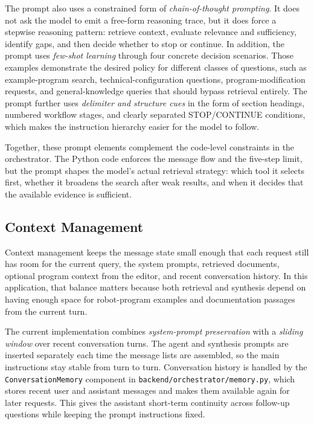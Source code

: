 The prompt also uses a constrained form of \textit{chain-of-thought prompting}. It does not ask the model to emit a free-form reasoning trace, but it does force a stepwise reasoning pattern: retrieve context, evaluate relevance and sufficiency, identify gaps, and then decide whether to stop or continue. In addition, the prompt uses \textit{few-shot learning} through four concrete decision scenarios. Those examples demonstrate the desired policy for different classes of questions, such as example-program search, technical-configuration questions, program-modification requests, and general-knowledge queries that should bypass retrieval entirely. The prompt further uses \textit{delimiter and structure cues} in the form of section headings, numbered workflow stages, and clearly separated STOP/CONTINUE conditions, which makes the instruction hierarchy easier for the model to follow.

Together, these prompt elements complement the code-level constraints in the orchestrator. The Python code enforces the message flow and the five-step limit, but the prompt shapes the model's actual retrieval strategy: which tool it selects first, whether it broadens the search after weak results, and when it decides that the available evidence is sufficient.


\subsection{Context Management}
Context management keeps the message state small enough that each request still has room for the current query, the system prompts, retrieved documents, optional program context from the editor, and recent conversation history. In this application, that balance matters because both retrieval and synthesis depend on having enough space for robot-program examples and documentation passages from the current turn.

The current implementation combines \textit{system-prompt preservation} with a \textit{sliding window} over recent conversation turns. The agent and synthesis prompts are inserted separately each time the message lists are assembled, so the main instructions stay stable from turn to turn. Conversation history is handled by the \texttt{ConversationMemory} component in \texttt{backend/orchestrator/memory.py}, which stores recent user and assistant messages and makes them available again for later requests. This gives the assistant short-term continuity across follow-up questions while keeping the prompt instructions fixed.

